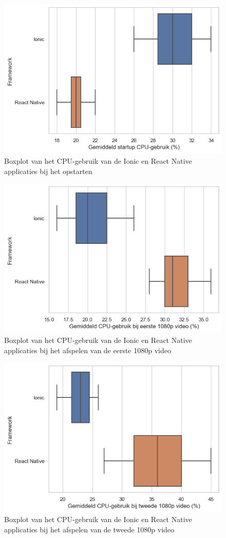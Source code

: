 \begin{figure}
  \centering
  \includegraphics[width=0.7\linewidth]{img/cpu/startup}
  \caption{Boxplot van het CPU-gebruik van de Ionic en React Native applicaties bij het opstarten}
  \label{fig:Boxplot van het CPU-gebruik van de Ionic en React Native applicaties bij het opstarten}
\end{figure}

\begin{figure}
  \centering
  \includegraphics[width=0.7\linewidth]{img/cpu/HD1}
  \caption{Boxplot van het CPU-gebruik van de Ionic en React Native applicaties bij het afspelen van de eerste 1080p video}
  \label{fig:Boxplot van het CPU-gebruik van de Ionic en React Native applicaties bij het afspelen van de eerste 1080p video}
\end{figure}

\begin{figure}
  \centering
  \includegraphics[width=0.7\linewidth]{img/cpu/HD2}
  \caption{Boxplot van het CPU-gebruik van de Ionic en React Native applicaties bij het afspelen van de tweede 1080p video}
  \label{fig:Boxplot van het CPU-gebruik van de Ionic en React Native applicaties bij het afspelen van de tweede 1080p video}
\end{figure}

